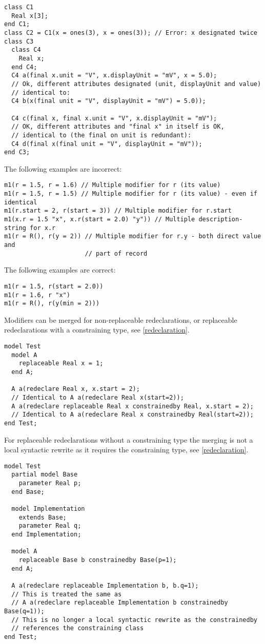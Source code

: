\begin{example}
\begin{lstlisting}[language=modelica]
class C1
  Real x[3];
end C1;
class C2 = C1(x = ones(3), x = ones(3)); // Error: x designated twice
class C3
  class C4
    Real x;
  end C4;
  C4 a(final x.unit = "V", x.displayUnit = "mV", x = 5.0);
  // Ok, different attributes designated (unit, displayUnit and value)
  // identical to:
  C4 b(x(final unit = "V", displayUnit = "mV") = 5.0));

  C4 c(final x, final x.unit = "V", x.displayUnit = "mV");
  // OK, different attributes and "final x" in itself is OK,
  // identical to (the final on unit is redundant):
  C4 d(final x(final unit = "V", displayUnit = "mV"));
end C3;
\end{lstlisting}

The following examples are incorrect:
\begin{lstlisting}[language=modelica]
m1(r = 1.5, r = 1.6) // Multiple modifier for r (its value)
m1(r = 1.5, r = 1.5) // Multiple modifier for r (its value) - even if identical
m1(r.start = 2, r(start = 3)) // Multiple modifier for r.start
m1(x.r = 1.5 "x", x.r(start = 2.0) "y")) // Multiple description-string for x.r
m1(r = R(), r(y = 2)) // Multiple modifier for r.y - both direct value and
                      // part of record
\end{lstlisting}
The following examples are correct:
\begin{lstlisting}[language=modelica]
m1(r = 1.5, r(start = 2.0))
m1(r = 1.6, r "x")
m1(r = R(), r(y(min = 2)))
\end{lstlisting}

Modifiers can be merged for non-replaceable redeclarations, or replaceable redeclarations with a constraining type, see \cref{redeclaration}.
\begin{lstlisting}[language=modelica]
model Test
  model A
    replaceable Real x = 1;
  end A;

  A a(redeclare Real x, x.start = 2);
  // Identical to A a(redeclare Real x(start=2));
  A a(redeclare replaceable Real x constrainedby Real, x.start = 2);
  // Identical to A a(redeclare Real x constrainedby Real(start=2));
end Test;
\end{lstlisting}

For replaceable redeclarations without a constraining type the merging is not a local syntactic rewrite as it requires the constraining type, see \cref{redeclaration}.
\begin{lstlisting}[language=modelica]
model Test
  partial model Base
    parameter Real p;
  end Base;

  model Implementation
    extends Base;
    parameter Real q;
  end Implementation;

  model A
    replaceable Base b constrainedby Base(p=1);
  end A;

  A a(redeclare replaceable Implementation b, b.q=1);
  // This is treated the same as
  // A a(redeclare replaceable Implementation b constrainedby Base(q=1));
  // This is no longer a local syntactic rewrite as the constrainedby
  // references the constraining class
end Test;
\end{lstlisting}
\end{example}

